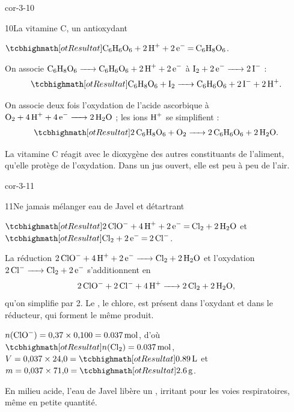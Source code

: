 \begin{blocLivre}{cor-3-10}
\begin{corrige}{10}{La vitamine C, un antioxydant}
\begin{questions}
\item $\res{\ce{C6H6O6 + 2H+ + 2e- = C6H8O6}}$.
\item On associe $\ce{C6H8O6 -> C6H6O6 + 2H+ + 2e-}$ à $\ce{I2 + 2e- -> 2I-}$ :
\[\res{\ce{C6H8O6 + I2 -> C6H6O6 + 2I- + 2H+}}.\]
\item On associe deux fois l'oxydation de l'acide ascorbique à $\ce{O2 + 4H+ + 4e- -> 2H2O}$ ; les ions $\ce{H+}$ se simplifient :
\[\res{\ce{2C6H8O6 + O2 -> 2C6H6O6 + 2H2O}}.\]
\item La vitamine C réagit avec le dioxygène  des autres constituants de l'aliment, qu'elle protège de
l'oxydation. Dans un jus ouvert, elle est peu à peu  de l'air.
\end{questions}
\end{corrige}
\end{blocLivre}
\begin{blocLivre}{cor-3-11}
\begin{corrige}{11}{Ne jamais mélanger eau de Javel et détartrant}
\begin{questions}
\item $\res{\ce{2ClO- + 4H+ + 2e- = Cl2 + 2H2O}}$ et $\res{\ce{Cl2 + 2e- = 2Cl-}}$.
\item La réduction $\ce{2ClO- + 4H+ + 2e- -> Cl2 + 2H2O}$ et l'oxydation $\ce{2Cl- -> Cl2 + 2e-}$ s'additionnent en
\[\ce{2ClO- + 2Cl- + 4H+ -> 2Cl2 + 2H2O},\]
qu'on simplifie par 2. Le , le chlore, est présent dans l'oxydant et dans le réducteur, qui forment le même produit.
\item $n(\ce{ClO-})=0{,}37\times0{,}100=\qty{0,037}{mol}$, d'où $\res{n(\ce{Cl2})=\qty{0,037}{mol}}$, $V=0{,}037\times24{,}0=\res{\qty{0,89}{L}}$ et
$m=0{,}037\times71{,}0=\res{\qty{2,6}{g}}$.
\item En milieu acide, l'eau de Javel libère un , irritant pour les voies respiratoires, même en
petite quantité.
\end{questions}
\end{corrige}
\end{blocLivre}
